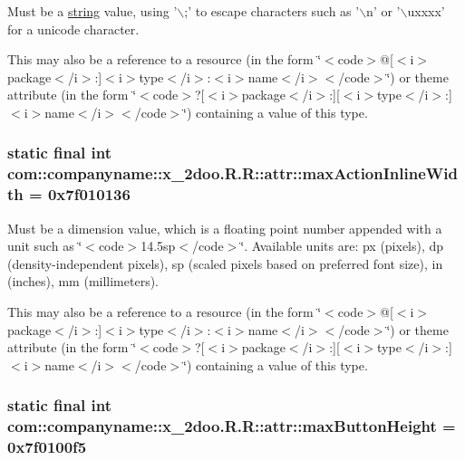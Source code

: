 Must be a \hyperlink{classcom_1_1companyname_1_1x__2doo_1_1_r_1_1string}{string} value, using '$\backslash$;' to escape characters such as '$\backslash$n' or '$\backslash$uxxxx' for a unicode character. 

This may also be a reference to a resource (in the form \char`\"{}$<$code$>$@\mbox{[}$<$i$>$package$<$/i$>$:\mbox{]}$<$i$>$type$<$/i$>$:$<$i$>$name$<$/i$>$$<$/code$>$\char`\"{}) or theme attribute (in the form \char`\"{}$<$code$>$?\mbox{[}$<$i$>$package$<$/i$>$:\mbox{]}\mbox{[}$<$i$>$type$<$/i$>$:\mbox{]}$<$i$>$name$<$/i$>$$<$/code$>$\char`\"{}) containing a value of this type. \hypertarget{classcom_1_1companyname_1_1x__2doo_1_1_r_1_1attr_0d806868df1eab18224e192dd5e8239d}{
\subsubsection[{maxActionInlineWidth}]{\setlength{\rightskip}{0pt plus 5cm}static final int com::companyname::x\_\-2doo.R.R::attr::maxActionInlineWidth = 0x7f010136}}
\label{classcom_1_1companyname_1_1x__2doo_1_1_r_1_1attr_0d806868df1eab18224e192dd5e8239d}


Must be a dimension value, which is a floating point number appended with a unit such as \char`\"{}$<$code$>$14.5sp$<$/code$>$\char`\"{}. Available units are: px (pixels), dp (density-independent pixels), sp (scaled pixels based on preferred font size), in (inches), mm (millimeters). 

This may also be a reference to a resource (in the form \char`\"{}$<$code$>$@\mbox{[}$<$i$>$package$<$/i$>$:\mbox{]}$<$i$>$type$<$/i$>$:$<$i$>$name$<$/i$>$$<$/code$>$\char`\"{}) or theme attribute (in the form \char`\"{}$<$code$>$?\mbox{[}$<$i$>$package$<$/i$>$:\mbox{]}\mbox{[}$<$i$>$type$<$/i$>$:\mbox{]}$<$i$>$name$<$/i$>$$<$/code$>$\char`\"{}) containing a value of this type. \hypertarget{classcom_1_1companyname_1_1x__2doo_1_1_r_1_1attr_f7e11d9d372c8a717661b86e807b8783}{
\subsubsection[{maxButtonHeight}]{\setlength{\rightskip}{0pt plus 5cm}static final int com::companyname::x\_\-2doo.R.R::attr::maxButtonHeight = 0x7f0100f5}}
\label{classcom_1_1companyname_1_1x__2doo_1_1_r_1_1attr_f7e11d9d372c8a717661b86e807b8783}


